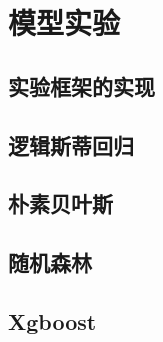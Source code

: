 \section{模型实验}
\label{sec:model}

\subsection{实验框架的实现}

\subsection{逻辑斯蒂回归}

\subsection{朴素贝叶斯}

\subsection{随机森林}

\subsection{Xgboost}